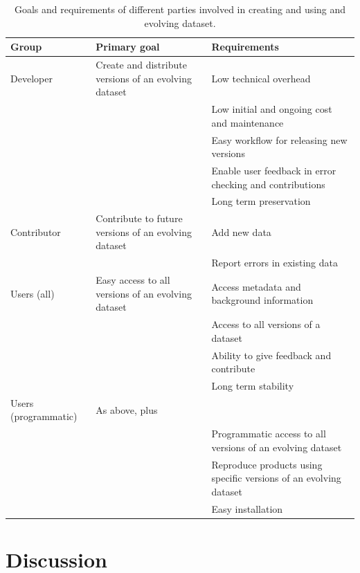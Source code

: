 \documentclass[a4paper,num-refs]{assets/oup-contemporary}
\begin{document}
\begin{table}[t!]
\centering
\caption{Goals and requirements of different parties involved in creating and using and evolving dataset.}
\vspace{0.2cm}
  \begin{tabular}{p{3cm}p{5cm}p{8cm}}
  \hline
  \textbf{Group} & \textbf{Primary goal} & \textbf{Requirements} \\ \hline
  Developer & Create and distribute versions of an evolving dataset & Low technical overhead \\
    & & Low initial and ongoing cost and maintenance \\
    & & Easy workflow for releasing new versions \\
    & & Enable user feedback in error checking and contributions \\
    & & Long term preservation \\
  Contributor & Contribute to future versions of an evolving dataset & Add new data \\
    & & Report errors in existing data \\
  Users (all) & Easy access to all versions of an evolving dataset & Access metadata and background information\\
    & & Access to all versions of a dataset\\
    & & Ability to give feedback and contribute \\
    & & Long term stability \\
  Users (programmatic) &  As above, plus\\
    & & Programmatic access to all versions of an evolving dataset \\
    & & Reproduce products using specific versions of an evolving dataset \\
    & & Easy installation \\
  \hline
  \end{tabular}
\label{tab:user_requirements}
\end{table}

\section{Discussion}
\end{document}

